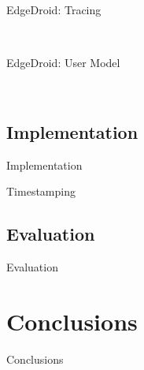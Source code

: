 \documentclass[aspectratio=1610]{beamer}
\begin{document}
\begin{frame}{EdgeDroid: Tracing}
    \begin{center}
        \\
    \end{center}
\end{frame}

\begin{frame}{EdgeDroid: User Model}
    \begin{center}
        \\
        \vspace{.1\textheight}%
    \end{center}
\end{frame}

\subsection{Implementation}
\begin{frame}{Implementation}
    \begin{center}
        
    \end{center}
\end{frame}

\begin{frame}{Timestamping}
    \begin{center}
        
    \end{center}
\end{frame}

\subsection{Evaluation}
\begin{frame}{Evaluation}

\end{frame}

\section{Conclusions}
\begin{frame}{Conclusions}
    
\end{frame}
\end{document}
